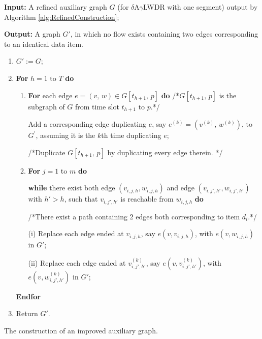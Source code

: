 \documentclass[11pt,english,onecolumn,draftcls]{IEEEtran}
\theoremstyle{plain}
\theoremstyle{plain}
\theoremstyle{plain}
\theoremstyle{plain}
\begin{document}
\begin{algorithm}
\textbf{Input: }A refined auxiliary graph $G$ (for $\delta$A$\gamma$LWDR
with one segment) output by Algorithm \ref{alg:RefinedConstruction};

\textbf{Output: }A graph $G'$, in which no flow exists containing
two edges corresponding to an identical data item.
\begin{enumerate}
\item $G':=G$;
\item \textbf{For} $h=1$ to $T$ \textbf{do}

\begin{enumerate}
\item \textbf{For} each edge $e=(v,\, w)\in G[t_{h+1},\, p]$ \textbf{do
}/{*}\textbf{$G[t_{h+1},\, p]$ }is the subgraph of $G$ from time
slot $t_{h+1}$ to $p$.{*}/


\quad{}Add a corresponding edge duplicating $e$, say $e^{(k)}=(v^{(k)},\, w^{(k)})$,
to $G^{'}$, assuming it is the $k$th time duplicating $e$;


\quad{}/{*}Duplicate $G[t_{h+1},\, p]$ by duplicating every edge
therein. {*}/

\item \textbf{For} $j=1$ to $m$ \textbf{do}


\quad{}\textbf{while} there exist both edge $(v_{i,j,h},w_{i,j,h})$
and edge $(v_{i,j',h'},w{}_{i,j',h'})$ with $h'>h$, such that $v_{i,j',h'}$
is reachable from $w_{i,j,h}$ \textbf{do}


\quad{}/{*}There exist a path containing 2 edges both corresponding
to item $d_{i}$.{*}/


\quad{}\quad{}(i) Replace each edge ended at $v_{i,j,h}$, say $e(v,v_{i,j,h})$,
with $e(v,w{}_{i,j,h})$ in $G'$;


\quad{}\quad{}(ii) Replace each edge ended at $v_{i,j',h'}^{(k)}$,
say $e(v,v_{i,j',h'}^{(k)})$, with $e(v,w{}_{i,j',h'}^{(k)})$ in
$G'$;

\end{enumerate}

\textbf{Endfor}

\item Return $G'$.
\end{enumerate}
\protect\caption{\label{alg:enhanced-construction}The construction of an improved
auxiliary graph.}
\end{algorithm}
\end{document}
